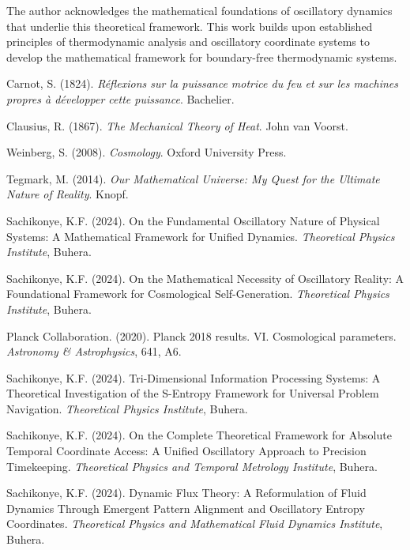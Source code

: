 \documentclass[11pt,a4paper]{article}
\theoremstyle{remark}
\begin{document}
The author acknowledges the mathematical foundations of oscillatory dynamics that underlie this theoretical framework. This work builds upon established principles of thermodynamic analysis and oscillatory coordinate systems to develop the mathematical framework for boundary-free thermodynamic systems.


\begin{thebibliography}{99}

Carnot, S. (1824). \textit{Réflexions sur la puissance motrice du feu et sur les machines propres à développer cette puissance}. Bachelier.

Clausius, R. (1867). \textit{The Mechanical Theory of Heat}. John van Voorst.

Weinberg, S. (2008). \textit{Cosmology}. Oxford University Press.

Tegmark, M. (2014). \textit{Our Mathematical Universe: My Quest for the Ultimate Nature of Reality}. Knopf.

Sachikonye, K.F. (2024). On the Fundamental Oscillatory Nature of Physical Systems: A Mathematical Framework for Unified Dynamics. \textit{Theoretical Physics Institute}, Buhera.

Sachikonye, K.F. (2024). On the Mathematical Necessity of Oscillatory Reality: A Foundational Framework for Cosmological Self-Generation. \textit{Theoretical Physics Institute}, Buhera.

Planck Collaboration. (2020). Planck 2018 results. VI. Cosmological parameters. \textit{Astronomy \& Astrophysics}, 641, A6.

Sachikonye, K.F. (2024). Tri-Dimensional Information Processing Systems: A Theoretical Investigation of the S-Entropy Framework for Universal Problem Navigation. \textit{Theoretical Physics Institute}, Buhera.

Sachikonye, K.F. (2024). On the Complete Theoretical Framework for Absolute Temporal Coordinate Access: A Unified Oscillatory Approach to Precision Timekeeping. \textit{Theoretical Physics and Temporal Metrology Institute}, Buhera.

Sachikonye, K.F. (2024). Dynamic Flux Theory: A Reformulation of Fluid Dynamics Through Emergent Pattern Alignment and Oscillatory Entropy Coordinates. \textit{Theoretical Physics and Mathematical Fluid Dynamics Institute}, Buhera.


\end{thebibliography}
\end{document}
